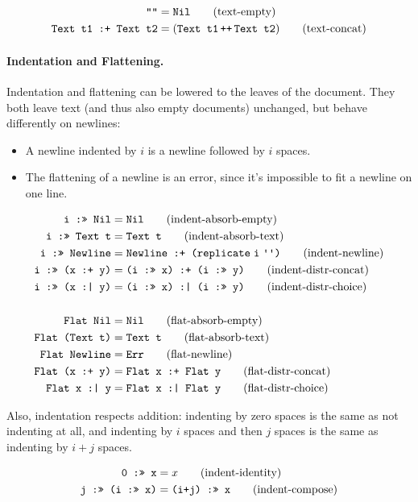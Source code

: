 \documentclass{article}
\newcommand{\ind}[2]{\texttt{#1 :>> #2}}
\newcommand{\cat}[2]{\texttt{#1 :+ #2}}
\newcommand{\choice}[2]{\texttt{#1 :| #2}}
\newcommand{\txt}[1]{\texttt{Text #1}}
\newcommand{\nil}{\texttt{Nil}}
\newcommand{\err}{\texttt{Err}}
\newcommand{\nl}{\texttt{Newline}}
\renewcommand{\flat}[1]{\texttt{Flat #1}}
\newcommand{\spaces}[1]{\texttt{replicate}\;#1\;\texttt{\textquotesingle \textquotesingle}}
\newcommand{\doubleplus}{\,\texttt{++}\,}
\begin{document}
\begin{align*}
  \texttt{""} &= \nil \tag{text-empty} \\
  \cat{\txt{t1}}{\txt{t2}} &= (\txt{t1} \doubleplus \txt{t2}) \tag{text-concat}
\end{align*}

\paragraph{Indentation and Flattening.}
Indentation and flattening can be lowered to the leaves of the document.  They both leave text (and
thus also empty documents) unchanged, but behave differently on newlines:
\begin{itemize}
\item A newline indented by $i$ is a newline followed by $i$ spaces.
\item The flattening of a newline is an error, since it's impossible to fit a newline on one line.
\end{itemize}

\begin{align*}
  \ind{i}{\nil} &= \nil
    \tag{indent-absorb-empty} \\
  \ind{i}{\txt{t}} &= \txt{t}
    \tag{indent-absorb-text} \\
  \ind{i}{\nl}  &= \cat{\nl}{(\spaces{i})}
    \tag{indent-newline} \\
  \ind{i}{(\cat{x}{y})} &= \cat{(\ind{i}{x})}{(\ind{i}{y})}
    \tag{indent-distr-concat} \\
  \ind{i}{(\choice{x}{y})} &= \choice{(\ind{i}{x})}{(\ind{i}{y})}
    \tag{indent-distr-choice} \\
  \\
  \flat{\nil} &= \nil
    \tag{flat-absorb-empty} \\
  \flat{(\txt{t})} &= \txt{t}
    \tag{flat-absorb-text} \\
  \flat{\nl} &= \err
    \tag{flat-newline} \\
  \flat{(\cat{x}{y})} &= \cat{\flat{x}}{\flat{y}}
    \tag{flat-distr-concat} \\
  \flat{\choice{x}{y}} &= \choice{\flat{x}}{\flat{y}}
    \tag{flat-distr-choice}
\end{align*}

Also, indentation respects addition: indenting by zero spaces is the same as not indenting at all,
and indenting by $i$ spaces and then $j$ spaces is the same as indenting by $i+j$ spaces.

\begin{align*}
  \ind{0}{x} &= x
    \tag{indent-identity} \\
  \ind{j}{(\ind{i}{x})} &= \ind{(i+j)}{x}
    \tag{indent-compose}
\end{align*}
\end{document}
